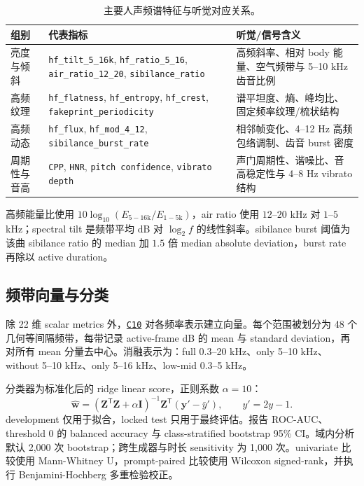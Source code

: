 \documentclass[UTF8,11pt,a4paper,fontset=none]{ctexart}
\newcommand{\coderef}[1]{\hyperlink{code:#1}{\texttt{#1}}}
\begin{document}
\begin{table}[H]
\centering
\small
\caption{主要人声频谱特征与听觉对应关系。}
\label{tab:metrics}
\begin{tabularx}{\linewidth}{p{34mm}p{49mm}X}
\toprule
组别 & 代表指标 & 听觉/信号含义 \\
\midrule
亮度与倾斜 & \texttt{hf\_tilt\_5\_16k}, \texttt{hf\_ratio\_5\_16}, \texttt{air\_ratio\_12\_20}, \texttt{sibilance\_ratio} & 高频斜率、相对 body 能量、空气频带与 5--10 kHz 齿音比例 \\
高频纹理 & \texttt{hf\_flatness}, \texttt{hf\_entropy}, \texttt{hf\_crest}, \texttt{fakeprint\_periodicity} & 谱平坦度、熵、峰均比、固定频率纹理/梳状结构 \\
高频动态 & \texttt{hf\_flux}, \texttt{hf\_mod\_4\_12}, \texttt{sibilance\_burst\_rate} & 相邻帧变化、4--12 Hz 高频包络调制、齿音 burst 密度 \\
周期性与音高 & \texttt{CPP}, \texttt{HNR}, \texttt{pitch confidence}, \texttt{vibrato depth} & 声门周期性、谐噪比、音高稳定性与 4--8 Hz vibrato 结构 \\
\bottomrule
\end{tabularx}
\end{table}

高频能量比使用 $10\log_{10}(E_{5-16\mathrm{k}}/E_{1-5\mathrm{k}})$，air ratio 使用 $12$--$20$ kHz 对 $1$--$5$ kHz；spectral tilt 是频带平均 dB 对 $\log_2 f$ 的线性斜率。sibilance burst 阈值为该曲 sibilance ratio 的 median 加 $1.5$ 倍 median absolute deviation，burst rate 再除以 active duration。

\subsection{频带向量与分类}

除 22 维 scalar metrics 外，\coderef{C10} 对各频率表示建立向量。每个范围被划分为 48 个几何等间隔频带，每带记录 active-frame dB 的 mean 与 standard deviation，再对所有 mean 分量去中心。消融表示为：full 0.3--20 kHz、only 5--10 kHz、without 5--10 kHz、only 5--16 kHz、low-mid 0.3--5 kHz。

分类器为标准化后的 ridge linear score，正则系数 $\alpha=10$：
\begin{equation}
\hat{\mathbf{w}}=(\mathbf{Z}^{\mathsf T}\mathbf{Z}+\alpha\mathbf{I})^{-1}
\mathbf{Z}^{\mathsf T}(\mathbf{y}'-\bar{y}'),\qquad y'=2y-1.
\label{eq:ridge}
\end{equation}
development 仅用于拟合，locked test 只用于最终评估。报告 ROC-AUC、threshold 0 的 balanced accuracy 与 class-stratified bootstrap 95\% CI。域内分析默认 2,000 次 bootstrap；跨生成器与时长 sensitivity 为 1,000 次。univariate 比较使用 Mann-Whitney U，prompt-paired 比较使用 Wilcoxon signed-rank，并执行 Benjamini-Hochberg 多重检验校正。
\end{document}
